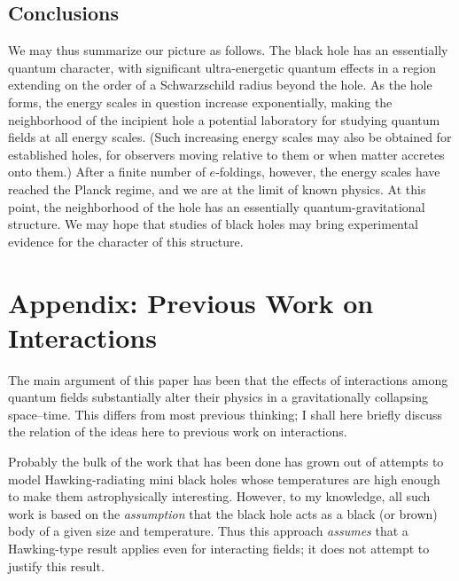 \documentclass[11pt]{article}
\begin{document}
\subsection{Conclusions}

We may thus summarize our picture as follows.  The black hole has an
essentially quantum character, with significant ultra-energetic quantum effects
in a region extending on the order of a Schwarzschild radius beyond the hole. 
As the hole forms, the energy scales in question increase exponentially, making
the neighborhood of the incipient hole a potential laboratory for studying
quantum fields at all energy scales.  (Such increasing energy scales may also
be obtained for established holes, for observers moving relative to them or
when matter accretes onto them.)  After a finite number of $e$-foldings,
however, the  energy scales have reached the Planck regime, and we are at the
limit of known physics. At this point, the neighborhood of the hole has an
essentially quantum-gravitational structure.  We may hope that studies of black
holes may bring experimental evidence for the character of this structure.



\section*{Appendix:  Previous Work on Interactions}

The main argument of this paper has been that the effects of interactions among
quantum fields substantially alter their physics in a gravitationally
collapsing space--time.  This differs from most previous
thinking; I shall here briefly discuss the relation of the ideas here to
previous work on interactions.

Probably the bulk of the work that has been done has grown out of attempts to
model Hawking-radiating mini black holes whose temperatures are high enough to
make them astrophysically interesting.  However, to my knowledge, all such work
is based on the {\em assumption} that the black hole acts as a black (or brown)
body of a given size and temperature.  Thus this approach {\em assumes} that a
Hawking-type result applies even for interacting fields; it does not attempt to
justify this result.  
\end{document}
